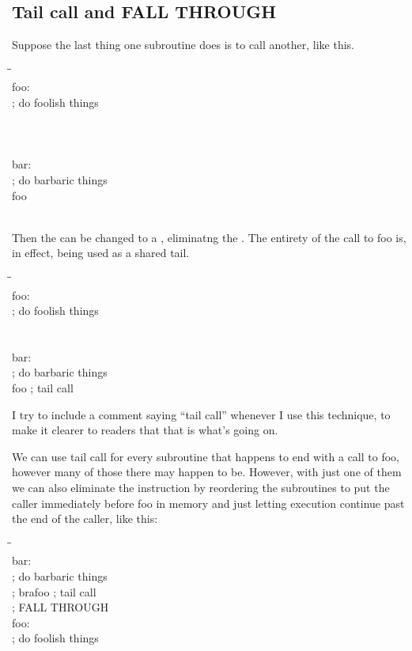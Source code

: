 \subsection{Tail call and FALL THROUGH}

Suppose the last thing one subroutine does is to call another, like this.
\begin{tabbing}
\qquad\=\qquad\qquad\=\kill
\\
foo:\\
\>; do foolish things\\
\>\\
\\\\
bar:\\
\>; do barbaric things\\
\>\>foo\\
\>\\
\end{tabbing}

Then the  can be changed to a , eliminatng the
.  The entirety of the call to foo is, in effect, being
used as a shared tail.
\begin{tabbing}
\qquad\=\qquad\qquad\=\kill
\\
foo:\\
\>; do foolish things\\
\>\\
\\
bar:\\
\>; do barbaric things\\
\>\>foo ; tail call\\
\end{tabbing}

I try to include a comment saying ``tail call'' whenever I use this
technique, to make it clearer to readers that that is what's going on.

We can use tail call for every subroutine that happens to end with a call to
foo, however many of those there may happen to be.  However, with just one
of them we can also eliminate the  instruction by reordering the
subroutines to put the caller immediately before foo in memory and just
letting execution continue past the end of the caller, like this:

\begin{tabbing}
\qquad\=\qquad\qquad\=\kill
\\
bar:\\
\>; do barbaric things\\
\>; bra\>foo ; tail call\\
\>; FALL THROUGH\\
foo:\\
\>; do foolish things\\
\>\\
\end{tabbing}

